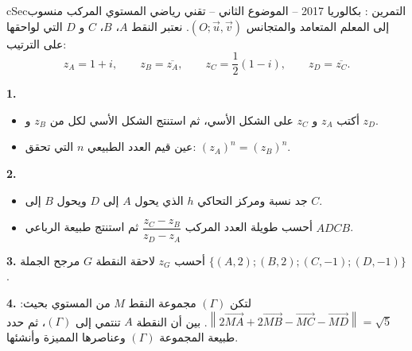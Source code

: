 \documentclass[12pt,a4paper]{article}
\newenvironment{BOX}[2]{\begin{otherlanguage}{english}\begin{arbox}{#1}{#2}}{\end{arbox}\end{otherlanguage}}
\newcounter{exo}
\newenvironment{tamrin}[1]{\stepcounter{exo}\begin{BOX}{cSec}{التمرين \theexo: #1}}{\end{BOX}}
\newenvironment{sq}{\begin{itemize}[leftmargin=2.4em,itemsep=3pt]}{\end{itemize}}
\newcommand{\qa}{\item[(أ)]}\newcommand{\qb}{\item[(ب)]}\newcommand{\qc}{\item[(جـ)]}\newcommand{\qd}{\item[(د)]}\newcommand{\qe}{\item[(هـ)]}
\newcommand{\QQ}[1]{\par\smallskip\textbf{#1.} }
\begin{document}
\begin{tamrin}{بكالوريا 2017 -- الموضوع الثاني -- تقني رياضي}
المستوي المركب منسوب إلى المعلم المتعامد والمتجانس $(O;\vec u,\vec v)$. نعتبر النقط $A$، $B$، $C$ و $D$ التي لواحقها على الترتيب:
\[z_A=1+i,\qquad z_B=\overline{z_A},\qquad z_C=\frac12(1-i),\qquad z_D=\overline{z_C}.\]
\QQ{1}
\begin{sq}
\qa أكتب $z_A$ و $z_C$ على الشكل الأسي، ثم استنتج الشكل الأسي لكل من $z_B$ و $z_D$.
\qb عين قيم العدد الطبيعي $n$ التي تحقق: $(z_A)^n=(z_B)^n$.
\end{sq}
\QQ{2}
\begin{sq}
\qa جد نسبة ومركز التحاكي $h$ الذي يحول $A$ إلى $D$ ويحول $B$ إلى $C$.
\qb أحسب طويلة العدد المركب $\dfrac{z_C-z_B}{z_D-z_A}$ ثم استنتج طبيعة الرباعي $ADCB$.
\end{sq}
\QQ{3} أحسب $z_G$ لاحقة النقطة $G$ مرجح الجملة $\{(A,2);(B,2);(C,-1);(D,-1)\}$.

\QQ{4} لتكن $(\Gamma)$ مجموعة النقط $M$ من المستوي بحيث: $\left\|2\overrightarrow{MA}+2\overrightarrow{MB}-\overrightarrow{MC}-\overrightarrow{MD}\right\|=\sqrt5$.
بين أن النقطة $A$ تنتمي إلى $(\Gamma)$، ثم حدد طبيعة المجموعة $(\Gamma)$ وعناصرها المميزة وأنشئها.
\end{tamrin}
\end{document}
